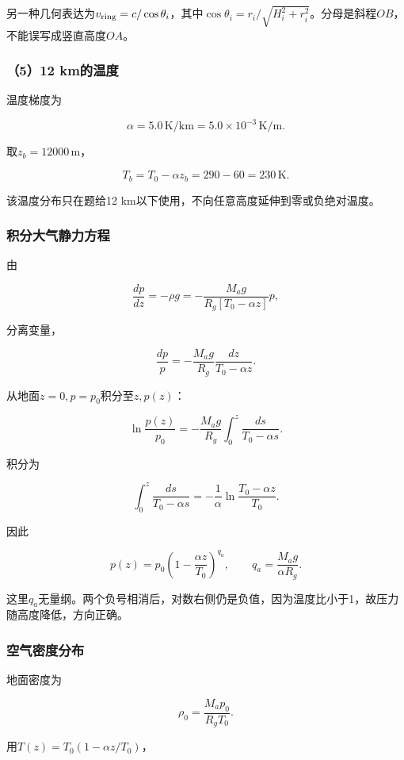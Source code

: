 \documentclass[12pt,a4paper,fontset=fandol]{ctexart}
\begin{document}
另一种几何表达为\(v_{\rm ring}=c/\cos\theta_i\)，其中\(\cos\theta_i=r_i/\sqrt{H_i^2+r_i^2}\)。分母是斜程\(OB\)，不能误写成竖直高度\(OA\)。

\subsubsection{（5）12 km的温度}\label{kmux7684ux6e29ux5ea6}

温度梯度为

\[
\alpha=5.0\,\mathrm{K/km}
=5.0\times10^{-3}\,\mathrm{K/m}.
\]

取\(z_b=12000\,\mathrm m\)，

\[
\boxed{T_b=T_0-\alpha z_b=290-60=230\,\mathrm K}.
\]

该温度分布只在题给12 km以下使用，不向任意高度延伸到零或负绝对温度。

\subsubsection{积分大气静力方程}\label{ux79efux5206ux5927ux6c14ux9759ux529bux65b9ux7a0b}

由

\[
\frac{dp}{dz}
=-\rho g
=-\frac{M_ag}{R_g[T_0-\alpha z]}p,
\]

分离变量，

\[
\frac{dp}{p}
=-\frac{M_ag}{R_g}
\frac{dz}{T_0-\alpha z}.
\]

从地面\(z=0,p=p_0\)积分至\(z,p(z)\)：

\[
\ln\frac{p(z)}{p_0}
=-\frac{M_ag}{R_g}
\int_0^z\frac{ds}{T_0-\alpha s}.
\]

积分为

\[
\int_0^z\frac{ds}{T_0-\alpha s}
=-\frac1\alpha
\ln\frac{T_0-\alpha z}{T_0}.
\]

因此

\[
\boxed{
p(z)=p_0
\left(1-\frac{\alpha z}{T_0}\right)^{q_a}},
\qquad
q_a=\frac{M_ag}{\alpha R_g}.
\]

这里\(q_a\)无量纲。两个负号相消后，对数右侧仍是负值，因为温度比小于1，故压力随高度降低，方向正确。

\subsubsection{空气密度分布}\label{ux7a7aux6c14ux5bc6ux5ea6ux5206ux5e03}

地面密度为

\[
\rho_0=\frac{M_ap_0}{R_gT_0}.
\]

用\(T(z)=T_0(1-\alpha z/T_0)\)，
\end{document}
